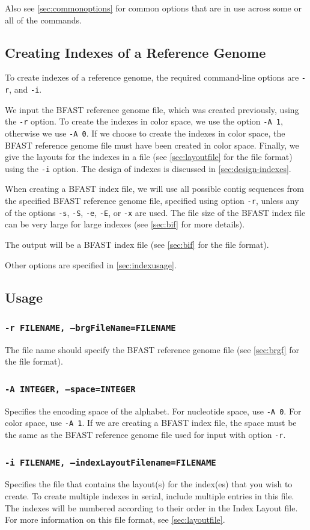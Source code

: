\documentclass[a4paper,12pt]{book}
\newcommand{\TT}[1]{{\tt #1}} %
\newcommand{\BRGF}{BFAST reference genome file} %
\newcommand{\BIF}{BFAST index file} %
\begin{document}
Also see \autoref{sec:commonoptions} for common options that are in use across some or all of the commands.
\subsection{Creating Indexes of a Reference Genome}
\label{sec:creating-bifs}
To create indexes of a reference genome, the required command-line options are \TT{-r}, and \TT{-i}.

We input the \BRGF{}, which was created previously, using the \TT{-r} option.
To create the indexes in color space, we use the option \TT{-A 1}, otherwise we use \TT{-A 0}.
If we choose to create the indexes in color space, the \BRGF{} must have been created in color space.
Finally, we give the layouts for the indexes in a file (see \autoref{sec:layoutfile} for the file format) using the \TT{-i} option.
The design of indexes is discussed in \autoref{sec:design-indexes}.

When creating a \BIF{}, we will use all possible contig sequences from the specified \BRGF{}, specified using option \TT{-r}, unless any of the options \TT{-s}, \TT{-S}, \TT{-e}, \TT{-E}, or \TT{-x} are used.
The file size of the \BIF{} can be very large for large indexes (see \autoref{sec:bif} for more details).

The output will be a \BIF{} (see \autoref{sec:bif} for the file format).

Other options are specified in \autoref{sec:indexusage}.
\subsection{Usage}
\label{sec:indexusage}

\subsubsection{\TT{-r FILENAME, --brgFileName=FILENAME}}
The file name should specify the \BRGF{} (see \autoref{sec:brgf} for the file format).

\subsubsection{\TT{-A INTEGER, --space=INTEGER}}
Specifies the encoding space of the alphabet.
For nucleotide space, use \TT{-A 0}.
For color space, use \TT{-A 1}.
If we are creating a \BIF{}, the space must be the same as the \BRGF{} used for input with option \TT{-r}. 

\subsubsection{\TT{-i FILENAME, --indexLayoutFilename=FILENAME}}
Specifies the file that contains the layout(s) for the index(es) that you wish to create.
To create multiple indexes in serial, include multiple entries in this file.
The indexes will be numbered according to their order in the Index Layout file.
For more information on this file format, see \autoref{sec:layoutfile}.
\end{document}
